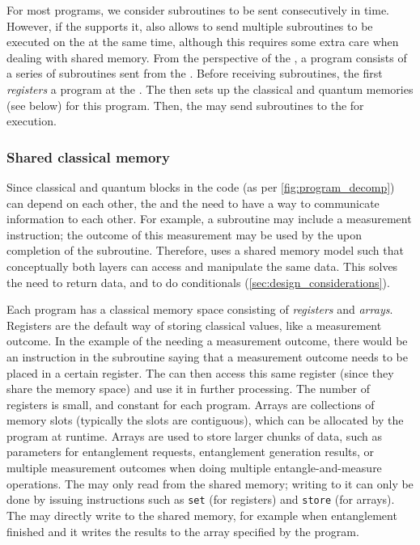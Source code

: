 For most programs, we consider subroutines to be sent consecutively in time.
However, if the \QNPU supports it, \netqasm also allows to send multiple subroutines to be executed on the \QNPU at the same time, although this requires some extra care when dealing with shared memory.
From the perspective of the \QNPU, a program consists of a series of subroutines sent from the \host.
Before receiving subroutines, the \host first \textit{registers} a program at the \QNPU.
The \QNPU then sets up the classical and quantum memories (see below) for this program.
Then, the \host may send subroutines to the \QNPU for execution.


\subsubsection{Shared classical memory}
Since classical and quantum blocks in the code (as per \cref{fig:program_decomp}) can depend on each other, the \host and the \QNPU need to have a way to communicate information to each other.
For example, a subroutine may include a measurement instruction; the outcome of this measurement may be used by the \host upon completion of the subroutine.
Therefore, \netqasm uses a shared memory model such that conceptually both layers can access and manipulate the same data. This solves the need to return data, and to do conditionals (\cref{sec:design_considerations}).

Each program has a classical memory space consisting of \textit{registers} and \textit{arrays}.
Registers are the default way of storing classical values, like a measurement outcome.
In the example of the \host needing a measurement outcome, there would be an instruction in the subroutine saying that a measurement outcome needs to be placed in a certain register.
The \host can then access this same register (since they share the memory space) and use it in further processing.
The number of registers is small, and constant for each program.
Arrays are collections of memory slots (typically the slots are contiguous), which can be allocated by the program at runtime.
Arrays are used to store larger chunks of data, such as parameters for entanglement requests, entanglement generation results, or multiple measurement outcomes when doing multiple entangle-and-measure operations.
The \host may only read from the shared memory; writing to it can only be done by issuing \netqasm instructions such as \texttt{set} (for registers) and \texttt{store} (for arrays).
The \QNPU may directly write to the shared memory, for example when entanglement finished and it writes the results to the array specified by the program.


